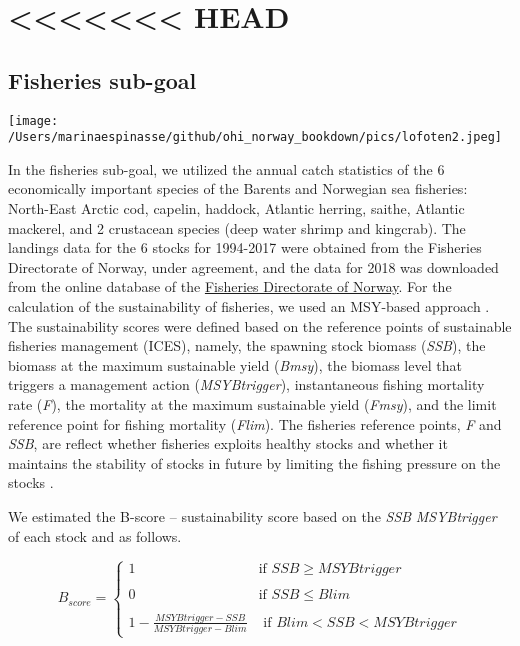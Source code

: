 \documentclass[
]{book}
\begin{document}
\hypertarget{head}{%
\chapter{\textless\textless\textless\textless\textless\textless\textless{} HEAD}\label{head}}

\hypertarget{fisheries-sub-goal}{%
\section{Fisheries sub-goal}\label{fisheries-sub-goal}}

\texttt{[image: /Users/marinaespinasse/github/ohi\_norway\_bookdown/pics/lofoten2.jpeg]}

In the fisheries sub-goal, we utilized the annual catch statistics of the 6 economically important species of the Barents and Norwegian sea fisheries: North-East Arctic cod, capelin, haddock, Atlantic herring, saithe, Atlantic mackerel, and 2 crustacean species (deep water shrimp and kingcrab).
The landings data for the 6 stocks for 1994-2017 were obtained from the Fisheries Directorate of Norway, under agreement, and the data for 2018 was downloaded from the online database of the \href{https://www.fiskeridir.no/Tall-og-analyse/AApne-data/AApne-datasett/Fangstdata-seddel-koblet-med-fartoeydata}{Fisheries Directorate of Norway}.
For the calculation of the sustainability of fisheries, we used an MSY-based approach \citep{gullestad2017towards}. The sustainability scores were defined based on the reference points of sustainable fisheries management (ICES), namely, the spawning stock biomass (\emph{SSB}), the biomass at the maximum sustainable yield (\emph{Bmsy}), the biomass level that triggers a management action (\emph{MSYBtrigger}), instantaneous fishing mortality rate (\emph{F}), the mortality at the maximum sustainable yield (\emph{Fmsy}), and the limit reference point for fishing mortality (\emph{Flim}). The fisheries reference points, \emph{F} and \emph{SSB}, are reflect whether fisheries exploits healthy stocks and whether it maintains the stability of stocks in future by limiting the fishing pressure on the stocks \citep{kleisner2013exploring}.

We estimated the B-score -- sustainability score based on the \emph{SSB} \emph{MSYBtrigger} of each stock and as follows.

\begin{equation}
  B_{score} =
    \begin{cases}
      1 & \text{if $SSB \ge MSYBtrigger$}\\
    \\
      0 & \text{if $SSB \le Blim$}\\
    \\
      1 - \frac{MSYBtrigger - SSB}{MSYBtrigger - Blim} & \text{ if $Blim < SSB < MSYBtrigger$}
\label{eq:fscore2}      
    \end{cases}   
\end{equation}
\end{document}
